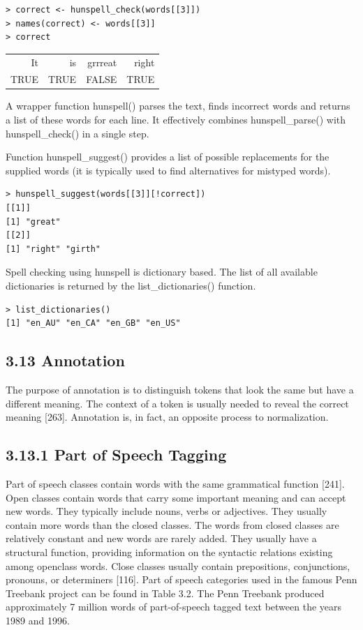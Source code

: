\documentclass[10pt]{book}
\begin{document}
\begin{verbatim}
> correct <- hunspell_check(words[[3]])
> names(correct) <- words[[3]]
> correct
\end{verbatim}

\begin{center}
\begin{tabular}{rrrr}
It & is & grrreat & right \\
TRUE & TRUE & FALSE & TRUE \\
\end{tabular}
\end{center}

A wrapper function hunspell() parses the text, finds incorrect words and returns a list of these words for each line. It effectively combines hunspell\_parse() with hunspell\_check() in a single step.

Function hunspell\_suggest() provides a list of possible replacements for the supplied words (it is typically used to find alternatives for mistyped words).

\begin{verbatim}
> hunspell_suggest(words[[3]][!correct])
[[1]]
[1] "great"
[[2]]
[1] "right" "girth"
\end{verbatim}

Spell checking using hunspell is dictionary based. The list of all available dictionaries is returned by the list\_dictionaries() function.

\begin{verbatim}
> list_dictionaries()
[1] "en_AU" "en_CA" "en_GB" "en_US"
\end{verbatim}

\subsection*{3.13 Annotation}
The purpose of annotation is to distinguish tokens that look the same but have a different meaning. The context of a token is usually needed to reveal the correct meaning [263]. Annotation is, in fact, an opposite process to normalization.

\subsection*{3.13.1 Part of Speech Tagging}
Part of speech classes contain words with the same grammatical function [241]. Open classes contain words that carry some important meaning and can accept new words. They typically include nouns, verbs or adjectives. They usually contain more words than the closed classes. The words from closed classes are relatively constant and new words are rarely added. They usually have a structural function, providing information on the syntactic relations existing among openclass words. Close classes usually contain prepositions, conjunctions, pronouns, or determiners [116]. Part of speech categories used in the famous Penn Treebank project can be found in Table 3.2. The Penn Treebank produced approximately 7 million words of part-of-speech tagged text between the years 1989 and 1996.
\end{document}
